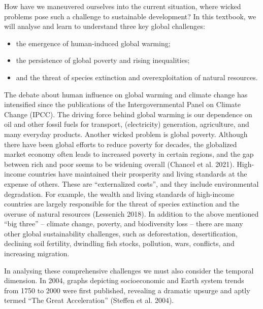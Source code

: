 \documentclass[
  a4paper,
  DIV=11,
  numbers=noendperiod,
  oneside,
  openany]{scrreprt}
\begin{document}
How have we maneuvered ourselves into the current situation, where
wicked problems pose such a challenge to sustainable development? In
this textbook, we will analyse and learn to understand three key global
challenges:

\begin{itemize}
\item
  the emergence of human-induced global warming;
\item
  the persistence of global poverty and rising inequalities;
\item
  and the threat of species extinction and overexploitation of natural
  resources.
\end{itemize}

The debate about human influence on global warming and climate change
has intensified since the publications of the Intergovernmental Panel on
Climate Change (IPCC). The driving force behind global warming is our
dependence on oil and other fossil fuels for transport, (electricity)
generation, agriculture, and many everyday products. Another wicked
problem is global poverty. Although there have been global efforts to
reduce poverty for decades, the globalized market economy often leads to
increased poverty in certain regions, and the gap between rich and poor
seems to be widening overall (Chancel et al. 2021). High-income
countries have maintained their prosperity and living standards at the
expense of others. These are ``externalized costs'', and they include
environmental degradation. For example, the wealth and living standards
of high-income countries are largely responsible for the threat of
species extinction and the overuse of natural resources (Lessenich
2018). In addition to the above mentioned ``big three'' -- climate
change, poverty, and biodiversity loss -- there are many other global
sustainability challenges, such as deforestation, desertification,
declining soil fertility, dwindling fish stocks, pollution, wars,
conflicts, and increasing migration.

In analysing these comprehensive challenges we must also consider the
temporal dimension. In 2004, graphs depicting socioeconomic and Earth
system trends from 1750 to 2000 were first published, revealing a
dramatic upsurge and aptly termed ``The Great Acceleration'' (Steffen et
al. 2004).
\end{document}
